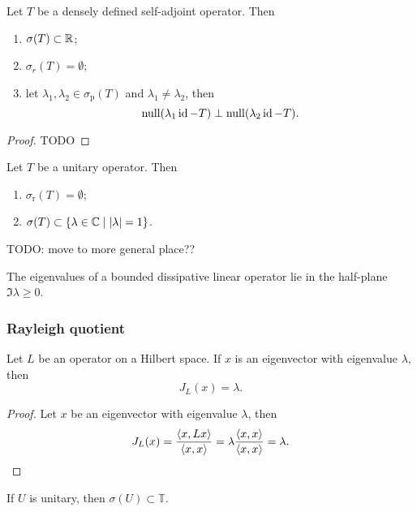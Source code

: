 \begin{proposition}
Let $T$ be a densely defined self-adjoint operator. Then
\begin{enumerate}
\item $\sigma(T) \subset \mathbb{R}$;
\item $\sigma_r(T) = \emptyset$;
\item let $\lambda_1,\lambda_2 \in \sigma_\text{p}(T)$ and $\lambda_1\neq \lambda_2$, then 
\[ \operatorname{null}(\lambda_1\operatorname{id} - T) \perp \operatorname{null}(\lambda_2 \operatorname{id} - T). \]
\end{enumerate}
\end{proposition}
\begin{proof}
TODO
\end{proof}

\begin{proposition}
Let $T$ be a unitary operator. Then
\begin{enumerate}
\item $\sigma_\text{r}(T) = \emptyset$;
\item $\sigma(T) \subset \left\{ \lambda\in\mathbb{C} \;\middle|\; |\lambda| = 1 \right\}$.
\end{enumerate}
\end{proposition}
TODO: move to more general place??

\begin{lemma}
The eigenvalues of a bounded dissipative linear operator
lie in the half-plane $\Im\lambda \geq 0$.
\end{lemma}

\subsubsection{Rayleigh quotient}
\begin{lemma}
Let $L$ be an operator on a Hilbert space. If $x$ is an eigenvector with eigenvalue $\lambda$, then
\[ J_L(x) = \lambda. \]
\end{lemma}
\begin{proof}
Let $x$ be an eigenvector with eigenvalue $\lambda$, then
\[ J_L(x) = \frac{\left\langle x,Lx \right\rangle}{\left\langle x,x \right\rangle} = \lambda \frac{\left\langle x,x \right\rangle}{\left\langle x,x \right\rangle} = \lambda. \]
\end{proof}

\begin{proposition}
If $U$ is unitary, then $\sigma(U)\subset \mathbb{T}$.
\end{proposition}


